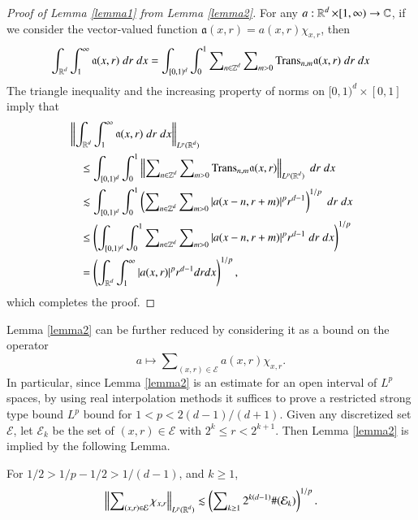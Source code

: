 \begin{proof}[Proof of Lemma \ref{lemma1} from Lemma \ref{lemma2}]
    For any $a: \operatorname{\mathbb{R}}^d \times [1,\infty) \to \operatorname{\mathbb{C}}$, if we consider the vector-valued function $\mathfrak{a}(x,r) = a(x,r) \chi_{x,r}$, then
    \begin{equation}
      \int_{\operatorname{\mathbb{R}}^d} \int_1^\infty \mathfrak{a}(x,r)\; dr\; dx = \int_{[0,1)^d} \int_0^1 \sum\nolimits_{n \in \operatorname{\mathbb{Z}}^d} \sum\nolimits_{m > 0} \text{Trans}_{n,m} \mathfrak{a}(x,r)\; dr\; dx
    \end{equation}
    The triangle inequality and the increasing property of norms on $[0,1)^d \times [0,1]$ imply that
    \begin{equation}
    \begin{split}
    &\left\| \int_{\operatorname{\mathbb{R}}^d} \int_1^\infty \mathfrak{a}(x,r)\; dr\; dx \right\|_{L^p(\operatorname{\mathbb{R}}^d)}\\
    &\quad \leq \int_{[0,1)^d} \int_0^1 \left\| \sum\nolimits_{n \in \operatorname{\mathbb{Z}}^d} \sum\nolimits_{m > 0} \text{Trans}_{n,m} \mathfrak{a}(x,r) \right\|_{L^p(\operatorname{\mathbb{R}}^d)}\; dr\; dx\\
    &\quad \lesssim \int_{[0,1)^d} \int_0^1 \left( \sum\nolimits_{n \in \operatorname{\mathbb{Z}}^d} \sum\nolimits_{m > 0} |a(x - n, r + m)|^p r^{d-1} \right)^{1/p}\; dr\; dx\\
    &\quad \leq \left( \int_{[0,1)^d} \int_0^1 \sum\nolimits_{n \in \operatorname{\mathbb{Z}}^d} \sum\nolimits_{m > 0} |a(x - n, r + m)|^p r^{d-1}\; dr\; dx \right)^{1/p}\\
    &\quad = \left( \int_{\operatorname{\mathbb{R}}^d} \int_1^\infty |a(x,r)|^p r^{d-1} dr dx \right)^{1/p},
    \end{split}
    \end{equation}
    which completes the proof.
\end{proof}

Lemma \ref{lemma2} can be further reduced by considering it as a bound on the operator
%
\begin{equation}
  a \mapsto \sum\nolimits_{(x,r) \in \mathcal{E}} a(x,r) \chi_{x,r}.
\end{equation}
%
In particular, since Lemma \ref{lemma2} is an estimate for an open interval of $L^p$ spaces, by using real interpolation methods it suffices to prove a restricted strong type bound $L^p$ bound for $1 < p < 2(d-1)/(d+1)$. Given any discretized set $\mathcal{E}$, let $\mathcal{E}_k$ be the set of $(x,r) \in \mathcal{E}$ with $2^k \leq r < 2^{k+1}$. Then Lemma \ref{lemma2} is implied by the following Lemma.

\begin{lemma} \label{lemma3}
    For $1/2 > 1/p - 1/2 > 1/(d-1)$, and $k \geq 1$,
    \[ \left\| \sum\nolimits_{(x,r) \in \mathcal{E}} \chi_{x,r} \right\|_{L^p(\operatorname{\mathbb{R}}^d)} \lesssim \left( \sum\nolimits_{k \geq 1} 2^{k(d-1)} \#(\mathcal{E}_k) \right)^{1/p}. \]
\end{lemma}

